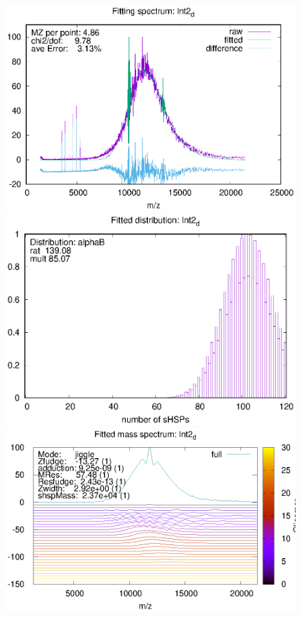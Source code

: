 \documentclass[a4paper,12pt]{report}
\begin{document}
\begin{figure}
\begin{minipage}[l]{0.323333\linewidth}
\centering
\includegraphics[trim=0mm 0mm 0mm 0mm, clip=true,width=1\textwidth]{figs/test.outInt2_d.eps}
\end{minipage}
\begin{minipage}[l]{0.323333\linewidth}
\centering
\includegraphics[trim=0mm 0mm 0mm 0mm, clip=true,width=1\textwidth]{figs/test.inpInt2_d.eps}
\end{minipage}
\begin{minipage}[l]{0.323333\linewidth}
\centering
\includegraphics[trim=0mm 0mm 0mm 0mm, clip=true,width=1\textwidth]{figs/test.out.comp.Int2_d.eps}
\end{minipage}

\end{figure}
\clearpage
\end{document}
